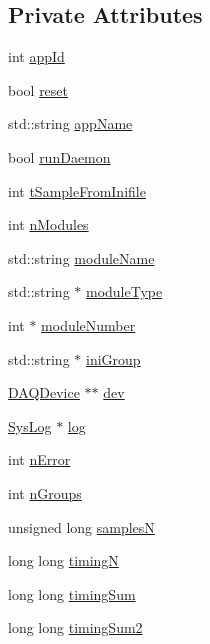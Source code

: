\subsection*{Private Attributes}
\begin{DoxyCompactItemize}
\item 
int \hyperlink{classReader_ae5710fab671a39e2e2c6472aa8cd5cf6}{app\-Id}
\item 
bool \hyperlink{classReader_ac7fb1595fa93f70c58656bff11091f94}{reset}
\item 
std\-::string \hyperlink{classReader_a6207e38c6bc804dabb6b086405c8231d}{app\-Name}
\item 
bool \hyperlink{classReader_a08302c0ae536dd0d0d2de37143eb7a94}{run\-Daemon}
\item 
int \hyperlink{classReader_abe8094976b8f244a539e34689dda91bc}{t\-Sample\-From\-Inifile}
\item 
int \hyperlink{classReader_abf76426a02d8896908e76edefa1821b2}{n\-Modules}
\item 
std\-::string \hyperlink{classReader_a0120f495d8251090cb5a406b6326c543}{module\-Name}
\item 
std\-::string $\ast$ \hyperlink{classReader_a082c78fbd3e67423e6ab134d4fb61cc9}{module\-Type}
\item 
int $\ast$ \hyperlink{classReader_aa816d9ed493e53da3119680a60a581ed}{module\-Number}
\item 
std\-::string $\ast$ \hyperlink{classReader_ab53774f0eac672c5d80f5f086e7b0d3b}{ini\-Group}
\item 
\hyperlink{classDAQDevice}{D\-A\-Q\-Device} $\ast$$\ast$ \hyperlink{classReader_a759e4aca2327cd6959af3273bb10c979}{dev}
\item 
\hyperlink{classSysLog}{Sys\-Log} $\ast$ \hyperlink{classReader_a3623b291506e1e6f54b90e00eeefdad8}{log}
\item 
int \hyperlink{classReader_a5d275c3577f7d7c02a6cc83f70d0dcc7}{n\-Error}
\item 
int \hyperlink{classReader_aa87a2b5443237f58cadeaa815e6e6790}{n\-Groups}
\item 
unsigned long \hyperlink{classReader_aa6c9e0275ed3601e6df4fcb194d97834}{samples\-N}
\item 
long long \hyperlink{classReader_a85c71a4d9f959cabea9cb7b168d966a0}{timing\-N}
\item 
long long \hyperlink{classReader_ab185760a9e7235b20f9cb21db44d0663}{timing\-Sum}
\item 
long long \hyperlink{classReader_a8a8de149490f7fe3c01413453c3d0a50}{timing\-Sum2}
$$
\end{DoxyCompactItemize}
